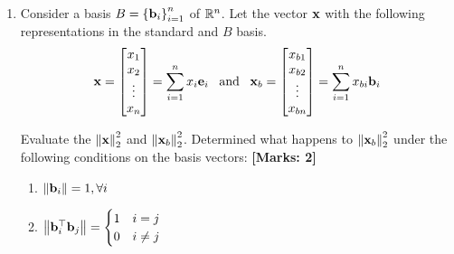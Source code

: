 \documentclass[12pt]{article}
\def\mf{\ensuremath\mathbf}
\def\mb{\ensuremath\mathbb}
\begin{document}
\begin{enumerate}



    \item Consider a basis $B = \left\{\mf{b}_i\right\}_{i=1}^{n}$ of $\mb{R}^n$. Let the vector $\mf{x}$ with the following representations in the standard and $B$ basis. 
    \[ \mf{x} = \begin{bmatrix*}x_1\\x_2\\\vdots\\x_n\end{bmatrix*} = \sum_{i=1}^{n}x_i\mf{e}_i \,\,\,\,\, \text{and} \,\,\,\,\, \mf{x}_b =  \begin{bmatrix*}x_{b1}\\x_{b2}\\\vdots\\x_{bn}\end{bmatrix*} = \sum_{i=1}^{n}x_{bi}\mf{b}_i \]

    Evaluate the $\left\lVert \mf{x}\right\rVert_2^2$ and $\left\lVert \mf{x}_b\right\rVert_2^2$. Determined what happens to $\left\lVert \mf{x}_b\right\rVert_2^2$ under the following conditions on the basis vectors: \textbf{[Marks: 2]}
    \begin{enumerate}
        \item $\left\lVert \mf{b}_i\right\rVert = 1, \forall i$
        \item $\left\lVert \mf{b}_i^\top\mf{b}_j\right\rVert = \begin{cases}
        1 & i = j\\
        0 & i \neq j
        \end{cases}$
    \end{enumerate}


\end{enumerate}
\end{document}
